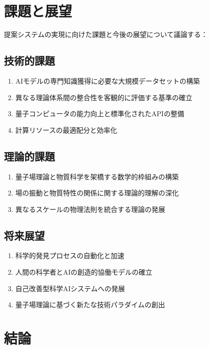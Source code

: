 \documentclass[12pt,a4paper]{article}
\begin{document}
\section{課題と展望}

提案システムの実現に向けた課題と今後の展望について議論する：

\subsection{技術的課題}

\begin{enumerate}
\item AIモデルの専門知識獲得に必要な大規模データセットの構築
\item 異なる理論体系間の整合性を客観的に評価する基準の確立
\item 量子コンピュータの能力向上と標準化されたAPIの整備
\item 計算リソースの最適配分と効率化
\end{enumerate}

\subsection{理論的課題}

\begin{enumerate}
\item 量子場理論と物質科学を架橋する数学的枠組みの構築
\item 場の振動と物質特性の関係に関する理論的理解の深化
\item 異なるスケールの物理法則を統合する理論の発展
\end{enumerate}

\subsection{将来展望}

\begin{enumerate}
\item 科学的発見プロセスの自動化と加速
\item 人間の科学者とAIの創造的協働モデルの確立
\item 自己改善型科学AIシステムへの発展
\item 量子場理論に基づく新たな技術パラダイムの創出
\end{enumerate}

\section{結論}
\end{document}
